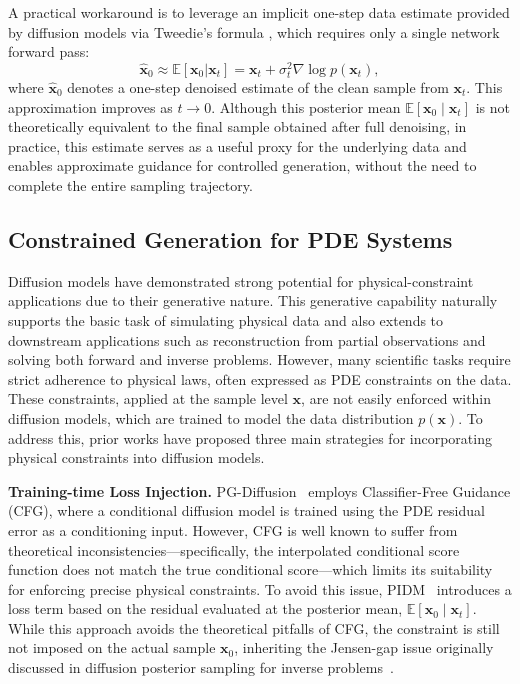 \documentclass{article}
\theoremstyle{plain}
\theoremstyle{definition}
\theoremstyle{remark}
\def\vx{{\bm{x}}}
\begin{document}
A practical workaround is to leverage an implicit one-step data estimate provided by diffusion models via Tweedie's formula \cite{efron2011tweedie}, which requires only a single network forward pass:
\begin{equation*}
\hat{\vx}_0\approx \mathbb{E}[\vx_0|\vx_t]= \vx_t+\sigma_t^2\nabla \log p(\vx_t),
\end{equation*}
where $\hat{\vx}_0$ denotes a one-step denoised estimate of the clean sample from $\vx_t$. This approximation improves as $t \to0$.
Although this posterior mean $\mathbb{E}[\vx_0 \mid \vx_t]$ is not theoretically equivalent to the final sample obtained after full denoising, in practice, this estimate serves as a useful proxy for the underlying data and enables approximate guidance for controlled generation, without the need to complete the entire sampling trajectory.


\subsection{Constrained Generation for PDE Systems} \label{Appendix:related-work:constrained-generation}

Diffusion models have demonstrated strong potential for physical-constraint applications due to their generative nature. This generative capability naturally supports the basic task of simulating physical data and also extends to downstream applications such as reconstruction from partial observations and solving both forward and inverse problems. However, many scientific tasks require strict adherence to physical laws, often expressed as PDE constraints on the data. These constraints, applied at the sample level \(\vx\), are not easily enforced within diffusion models, which are trained to model the data distribution \(p(\vx)\). To address this, prior works have proposed three main strategies for incorporating physical constraints into diffusion models.

\textbf{Training-time Loss Injection.} PG-Diffusion~\cite{shu2023physicscfg} employs Classifier-Free Guidance (CFG), where a conditional diffusion model is trained using the PDE residual error as a conditioning input. However, CFG is well known to suffer from theoretical inconsistencies---specifically, the interpolated conditional score function does not match the true conditional score---which limits its suitability for enforcing precise physical constraints. To avoid this issue, PIDM~\cite{bastek2025pdim} introduces a loss term based on the residual evaluated at the posterior mean, \(\mathbb{E}[\vx_0 \mid \vx_t]\). While this approach avoids the theoretical pitfalls of CFG, the constraint is still not imposed on the actual sample \(\vx_0\), inheriting the Jensen-gap issue originally discussed in diffusion posterior sampling for inverse problems~\cite{chung2022dps}.
\end{document}
